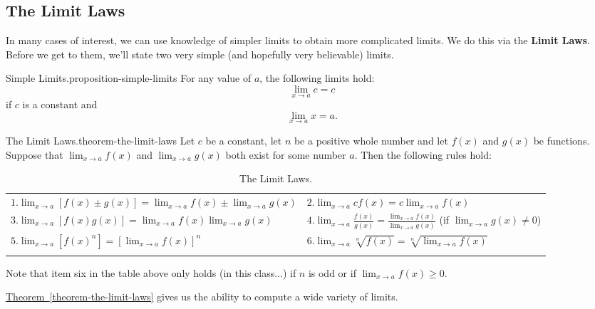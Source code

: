 \documentclass[10pt,]{book}
\newcommand{\terminology}[1]{\textbf{#1}}
\numberwithin{equation}{section}
\newcommand{\hrulethick} {\noalign{\hrule height 0.11em}}
\begin{document}
\subsection[{The Limit Laws}]{The Limit Laws}\label{subsection-the-limit-laws}
\hypertarget{p-20}{}%
In many cases of interest, we can use knowledge of simpler limits to obtain more complicated limits. We do this via the \terminology{Limit Laws}. Before we get to them, we'll state two very simple (and hopefully very believable) limits.%
\begin{proposition}{Simple Limits.}{}{proposition-simple-limits}%
\hypertarget{p-21}{}%
For any value of \(a\), the following limits hold:%
\begin{equation*}
\lim_{x\to a}c = c
\end{equation*}
if \(c\) is a constant and%
\begin{equation*}
\lim_{x\to a}x = a.
\end{equation*}
%
\end{proposition}
\begin{theorem}{The Limit Laws.}{}{theorem-the-limit-laws}%
\hypertarget{p-22}{}%
Let \(c\) be a constant, let \(n\) be a positive whole number and let \(f(x)\) and \(g(x)\) be functions. Suppose that \(\lim_{x\to a}f(x)\) and \(\lim_{x\to a}g(x)\) both exist for some number \(a\). Then the following rules hold:%
\begin{table}
\centering
\begin{tabular}{ll}\hrulethick
\(1. \lim_{x\to a}[f(x)\pm g(x)] = \lim_{x\to a}f(x)\pm \lim_{x\to a}g(x)\)&\(2. \lim_{x\to a}cf(x) = c\lim_{x\to a}f(x)\)\tabularnewline[0pt]
\(3. \lim_{x\to a}[f(x)g(x)] = \lim_{x\to a}f(x)\lim_{x\to a}g(x)\)&\(4. \lim_{x\to a}\frac{f(x)}{g(x)} = \frac{\lim_{x\to a}f(x)}{\lim_{x\to a}g(x)}\) (if \(\lim_{x\to a}g(x)\neq 0\))\tabularnewline[0pt]
\(5. \lim_{x\to a}[f(x)^{n}] = [\lim_{x\to a}f(x)]^{n}\)&\(6. \lim_{x\to a}\sqrt[n]{f(x)} = \sqrt[n]{\lim_{x\to a}f(x)}\)\tabularnewline\hrulethick
\end{tabular}
\caption{The Limit Laws.\label{table-limit-laws}}
\end{table}
\hypertarget{p-23}{}%
Note that item six in the table above only holds (in this class...) if \(n\) is odd or if \(\lim_{x\to a}f(x)\geq0\).%
\end{theorem}
\hypertarget{p-24}{}%
\hyperref[theorem-the-limit-laws]{Theorem~\ref{theorem-the-limit-laws}} gives us the ability to compute a wide variety of limits.%
\end{document}
